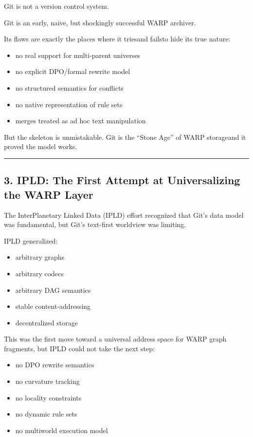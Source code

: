 Git is not a version control system.

Git is an early, naive, but shockingly successful WARP archiver.

Its flaws are exactly the places where it tries\emd{}and fails\emd{}to hide
its true nature:

\begin{itemize}
\tightlist
\item
  no real support for multi-parent universes
\item
  no explicit DPO/formal rewrite model
\item
  no structured semantics for conflicts
\item
  no native representation of rule sets
\item
  merges treated as ad hoc text manipulation
\end{itemize}

But the skeleton is unmistakable. Git is the ``Stone Age'' of WARP
storage\emd{}and it proved the model works.

\begin{center}\rule{0.5\linewidth}{0.5pt}\end{center}

\subsection{3. IPLD: The First Attempt at Universalizing the WARP
Layer}\label{ipld-the-first-attempt-at-universalizing-the-rmg-layer}

The InterPlanetary Linked Data (IPLD) effort recognized that Git's data
model was fundamental, but Git's text-first worldview was limiting.

IPLD generalized:

\begin{itemize}
\tightlist
\item
  arbitrary graphs
\item
  arbitrary codecs
\item
  arbitrary DAG semantics
\item
  stable content-addressing
\item
  decentralized storage
\end{itemize}

This was the first move toward a universal address space for WARP graph
fragments, but IPLD could not take the next step:

\begin{itemize}
\tightlist
\item
  no DPO rewrite semantics
\item
  no curvature tracking
\item
  no locality constraints
\item
  no dynamic rule sets
\item
  no multiworld execution model
\end{itemize}


